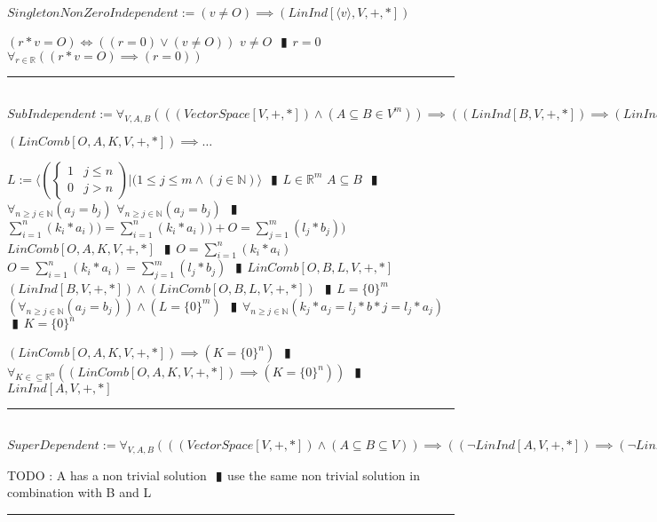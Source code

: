\documentclass{book}
\newcommand{\abr}{:=}
\newcommand{\pipe}{$\phantom{(}\vrectangleblack\phantom{)}$}
\newcommand{\pr}[1]{\left(#1\right)}
\begin{document}
$SingletonNonZeroIndependent \abr (v \neq O) \implies (LinInd[\langle v \rangle, V, +, *])$
\begin{enumerate}
  \lit $(r * v = O) \iff \pr{(r = 0) \lor (v \neq O)}$
  \lit $v \neq O$ \pipe $r = 0$
  \lit $\forall_{r \in \mathbb{R}}\pr{(r * v = O) \implies (r = 0)}$
\end{enumerate} \vspace{.75mm} \hrule \vspace{.75mm} \ \\ 

$SubIndependent \abr \forall_{V, A, B}\pr{\pr{(VectorSpace[V, +, *]) \land (A \subseteq B \in V^m)} \implies \pr{(LinInd[B, V, +, *]) \implies (LinInd[A, V, +, *])}}$
\begin{enumerate}
  \lit $(LinComb[O, A, K, V, +, *]) \implies \ldots$
  \begin{enumerate}
    \lit $L \abr \langle \left(\begin{cases} 
      1 & j \leq n \\
      0 & j > n 
    \end{cases}\right) | (1 \leq j \leq m \land (j \in \mathbb{N}) \rangle$ \pipe $L \in \mathbb{R}^m$
    \lit $A \subseteq B$ \pipe $\forall_{n \geq j \in \mathbb{N}}(a_j = b_j)$
    \lit $\forall_{n \geq j \in \mathbb{N}}(a_j = b_j)$ \pipe $\sum_{i = 1}^{n}(k_i * a_i)) = \sum_{i = 1}^{n}(k_i * a_i)) + O = \sum_{j = 1}^{m}(l_j * b_j))$
    \lit $LinComb[O, A, K, V, +, *]$ \pipe $O = \sum_{i = 1}^{n}(k_i * a_i)$
    \lit $O = \sum_{i = 1}^{n}(k_i * a_i) = \sum_{j = 1}^{m}(l_j * b_j)$ \pipe $LinComb[O, B, L, V, +, *]$
    \lit $(LinInd[B, V, +, *]) \land (LinComb[O, B, L, V, +, *])$ \pipe $L = \{0\}^m$ 
    \lit $\pr{\forall_{n \geq j \in \mathbb{N}}(a_j = b_j)} \land (L = \{0\}^m)$ \pipe $\forall_{n \geq j \in \mathbb{N}}(k_j * a_j = l_j * b*j = l_j * a_j)$ \pipe $K = \{0\}^n$
  \end{enumerate}
  \lit $(LinComb[O, A, K, V, +, *]) \implies (K = \{0\}^n)$ \pipe $\forall_{K \in \subseteq \mathbb{R}^n}\pr{(LinComb[O, A, K, V, +, *]) \implies (K = \{0\}^n)}$ \pipe $LinInd[A, V, +, *]$
\end{enumerate} \vspace{.75mm} \hrule \vspace{.75mm} \ \\ 

$SuperDependent \abr \forall_{V, A, B}\pr{\pr{(VectorSpace[V, +, *]) \land (A \subseteq B \subseteq V)} \implies \pr{(\lnot LinInd[A, V, +, *]) \implies (\lnot LinInd[B, V, +, *])}}$
\begin{enumerate}
  \lit TODO :  A has a non trivial solution \pipe use  the same non trivial solution in combination with B and L
\end{enumerate} \vspace{.75mm} \hrule \vspace{.75mm} \ \\ 
\end{document}
